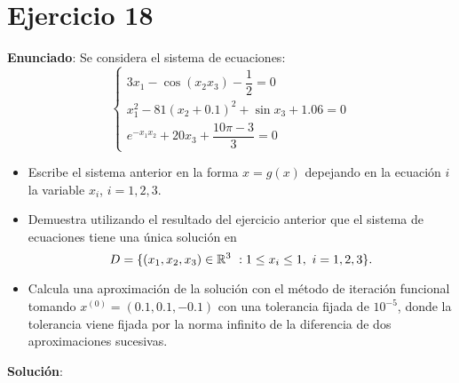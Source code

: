 \documentclass[11pt]{article}
\begin{document}
\section{Ejercicio 18}
\textbf{Enunciado}:
Se considera el sistema de ecuaciones:
\[
\begin{cases}
	3x_1 - \cos (x_2x_3) - \dfrac{1}{2} = 0\\
	 x_1^2 -81(x_2+0.1)^2 + \sin x_3 +1.06 = 0\\
	 e^{-x_1x_2}+20x_3+\dfrac{10\pi-3}{3} = 0
\end{cases}
\] 
\begin{itemize}
	\item Escribe el sistema anterior en la forma $x=g(x)$ depejando en la ecuación $i$ la variable $x_i$, $i=1,2,3$.
	\item Demuestra utilizando el resultado del ejercicio anterior que el sistema de ecuaciones tiene una única solución en 
	\[
	D = \{(x_1,x_2,x_3) \in \mathbb R^3 \ : \- 1 \leq x_i \leq 1, \ i = 1,2,3\}.
	\]
	
	\item Calcula una aproximación de la solución con el método de iteración funcional tomando $x^{(0)} = (0.1,0.1,-0.1)$ con una tolerancia fijada de $10^{-5}$, donde la tolerancia viene fijada por la norma infinito de la diferencia de dos aproximaciones sucesivas.

\end{itemize}

\textbf{Solución}:
\end{document}
